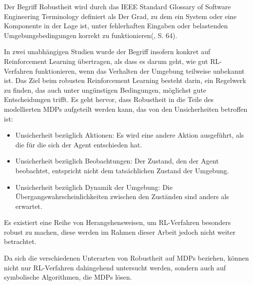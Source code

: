 \label{robustheit}

Der Begriff Robustheit wird durch das IEEE Standard Glossary of Software Engineering Terminology definiert als \glqq Der Grad, zu dem ein System oder eine Komponente in der Lage ist, unter fehlerhaften Eingaben oder belastenden Umgebungsbedingungen korrekt zu funktionieren\grqq{}(\cite{IEEE.1990}, S. 64).

In zwei unabhängigen Studien wurde der Begriff insofern konkret auf Reinforcement Learning übertragen, als dass es darum geht, wie gut RL-Verfahren funktionieren, wenn das Verhalten der Umgebung teilweise unbekannt ist. Das Ziel beim robusten Reinforcement Learning besteht darin, ein Regelwerk zu finden, das auch unter ungünstigen Bedingungen, möglichst gute Entscheidungen trifft. Es geht hervor, dass Robustheit in die Teile des modellierten MDPs aufgeteilt werden kann, das von den Unsicherheiten betroffen ist:

\begin{itemize}
	\item Unsicherheit bezüglich Aktionen: Es wird eine andere Aktion ausgeführt, als die für die sich der Agent entschieden hat.
	\item Unsicherheit bezüglich Beobachtungen: Der Zustand, den der Agent beobachtet, entspricht nicht dem tatsächlichen Zustand der Umgebung.
	\item Unsicherheit bezüglich Dynamik der Umgebung: Die Übergangswahrscheinlichkeiten zwischen den Zuständen sind anders als erwartet.
\end{itemize}

Es existiert eine Reihe von Herangehensweisen, um RL-Verfahren besonders robust zu machen, diese werden im Rahmen dieser Arbeit jedoch nicht weiter betrachtet\cite{Moos.2022}\cite{Ni.2021}.

Da sich die verschiedenen Unterarten von Robustheit auf MDPs beziehen, können nicht nur RL-Verfahren dahingehend untersucht werden, sondern auch auf symbolische Algorithmen, die MDPs lösen.

